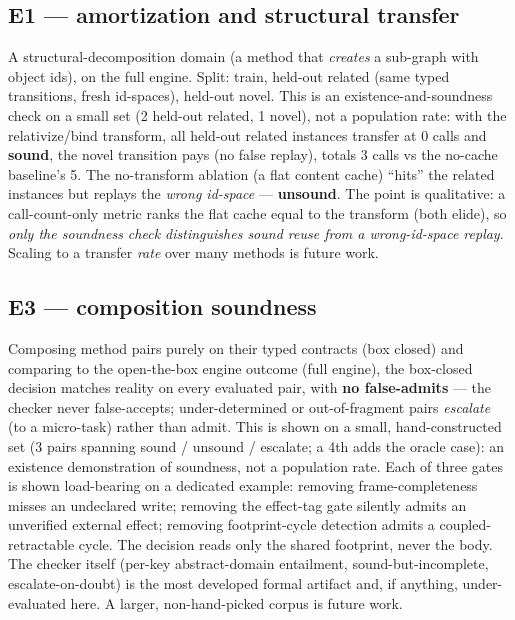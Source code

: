 \documentclass[11pt]{article}
\begin{document}
\subsection{E1 --- amortization and structural transfer}
A structural-decomposition domain (a method that \emph{creates} a sub-graph with object ids), on the full engine.
Split: train, held-out related (same typed transitions, fresh id-spaces), held-out novel. This is an
existence-and-soundness check on a small set (2 held-out related, 1 novel), not a population rate: with the
relativize/bind transform, all held-out related instances transfer at 0 calls and \textbf{sound}, the novel
transition pays (no false replay), totals 3 calls vs the no-cache baseline's 5. The no-transform ablation (a flat
content cache) ``hits'' the related instances but replays the \emph{wrong id-space} --- \textbf{unsound}. The point
is qualitative: a call-count-only metric ranks the flat cache equal to the transform (both elide), so \emph{only the
soundness check distinguishes sound reuse from a wrong-id-space replay}. Scaling to a transfer \emph{rate} over many
methods is future work.

\subsection{E3 --- composition soundness}\label{sec:e3}
Composing method pairs purely on their typed contracts (box closed) and comparing to the open-the-box engine outcome
(full engine), the box-closed decision matches reality on every evaluated pair, with \textbf{no false-admits} --- the
checker never false-accepts; under-determined or out-of-fragment pairs \emph{escalate} (to a micro-task) rather than
admit. This is shown on a small, hand-constructed set (3 pairs spanning sound / unsound / escalate; a 4th adds the
oracle case): an existence demonstration of soundness, not a population rate. Each of three gates is shown
load-bearing on a dedicated example: removing frame-completeness misses an undeclared write; removing the effect-tag
gate silently admits an unverified external effect; removing footprint-cycle detection admits a coupled-retractable
cycle. The decision reads only the shared footprint, never the body. The checker itself (per-key abstract-domain
entailment, sound-but-incomplete, escalate-on-doubt) is the most developed formal artifact and, if anything,
under-evaluated here. A larger, non-hand-picked corpus is future work.
\end{document}
